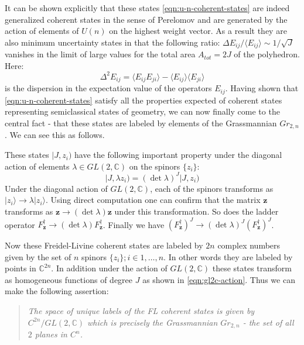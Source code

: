 \documentclass[twocolumn,final,aps,nofootinbib,nobibnotes]{revtex4-2}
\newcommand{\C}{\mathbb{C}}
\newcommand{\bz}{\mathbf{z}}
\newcommand{\expect}[1]{\langle #1\rangle}
\newcommand{\ket}[1]{\vert #1 \rangle}
\newcommand{\bket}[1]{\vert #1 )}
\begin{document}
It can be shown explicitly \cite{Freidel2010UN-Coherent} that these states \eqref{eqn:u-n-coherent-states} are indeed generalized coherent states in the sense of Perelomov \cite{Perelomov1977Generalized} and are generated by the action of elements of $ U(n) $ on the highest weight vector. As a result they are also minimum uncertainty states in that the following ratio: $ \Delta E_{ij}/\expect{E_{ij}} \sim 1/\sqrt{J} $ vanishes in the limit of large values for the total area $ A_{tot} = 2 J  $ of the polyhedron. Here:
\begin{equation}\label{eqn:e-op-uncertainty}
	\Delta^2 E_{ij} = \expect{E_{ij}E_{ji}} - \expect{E_{ij}} \expect{E_{ji}}
\end{equation}
is the dispersion in the expectation value of the operators $ E_{ij} $. Having shown that \eqref{eqn:u-n-coherent-states} satisfy all the properties expected of coherent states representing semiclassical states of geometry, we can now finally come to the central fact - that these states are labeled by elements of the Grassmannian $ Gr_{2,n} $. We can see this as follows.

These states $ \bket{J, z_i} $ have the following important property under the diagonal action of elements $ \lambda \in GL(2,\C) $ on the spinors $ \{z_i\} $:
\begin{equation}\label{eqn:gl2c-action}
	\bket{J, \lambda z_i} = (\det \lambda)^J \bket{J,z_i}
\end{equation}
Under the diagonal action of $ GL(2,\C) $, each of the spinors transforms as $ \ket{z_i} \rightarrow \lambda \ket{z_i} $. Using direct computation one can confirm that the matrix $ \bz $ transforms as $ \bz \rightarrow (\det \lambda) \bz $ under this transformation. So does the ladder operator $ F^\dag_\bz \rightarrow (\det \lambda)  F^\dag_\bz $. Finally we have $ (F^\dag_\bz)^J \rightarrow (\det \lambda)^J  (F^\dag_\bz)^J $.

Now these Freidel-Livine coherent states are labeled by $ 2n $ complex numbers given by the set of $ n $ spinors $ \{z_i\}; i \in 1, \ldots, n $. In other words they are labeled by points in $ \C^{2n} $. In addition under the action of $ GL(2,\C) $ these states transform as homogeneous functions of degree $ J $ as shown in \eqref{eqn:gl2c-action}. Thus we can make the following assertion:

\begin{quote}
	\textit{The space of unique labels of the FL coherent states is given by $ C^{2n}/GL(2,\C) $ which is precisely the Grassmannian $ Gr_{2,n} $ - the set of all $ 2 $ planes in $ C^n $.}
\end{quote}
\end{document}
